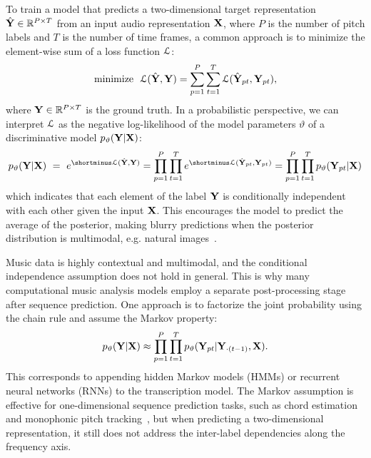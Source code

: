 To train a model that predicts a two-dimensional target representation $\hat{\mathbf{Y}} \in \mathbb{R}^{P \times T}$ from an input audio representation $\mathbf{X}$, where $P$ is the number of pitch labels and $T$ is the number of time frames, a common approach is to minimize the element-wise sum of a loss function $\mathcal{L}$:
\begin{equation}\label{eqn:elementwise}
\textrm{minimize} ~~ \mathcal{L}(\hat{\mathbf{Y}}, \mathbf{Y}) = \sum_{p=1}^{P}  \sum_{t=1}^{T} \mathcal{L} (\hat{\mathbf{Y}}_{pt}, \mathbf{Y}_{pt}),
\end{equation}
where $\mathbf{Y} \in \mathbb{R}^{P \times T}$ is the ground truth.
In a probabilistic perspective, we can interpret $\mathcal{L}$ as the negative log-likelihood of the model parameters $\vartheta$ of a discriminative model $p_\vartheta(\mathbf{Y} | \mathbf{X})$:
\begin{equation}
p_\vartheta(\Y | \X) ~=~ e^{\shortminus\L(\hat{\Y}, \Y)} = \prod_{p=1}^{P} \prod_{t=1}^{T} e^{\shortminus\L(\hat{\Y}_{pt}, \Y_{pt})} = \prod_{p=1}^{P} \prod_{t=1}^{T} p_\vartheta(\Y_{pt} | \X)
\end{equation}
which indicates that each element of the label $\mathbf{Y}$ is conditionally independent with each other given the input $\mathbf{X}$.
This encourages the model to predict the average of the posterior, making blurry predictions when the posterior distribution is multimodal, e.g. natural images~\cite{dosovitskiy2016generating}.

Music data is highly contextual and multimodal, and the conditional independence assumption does not hold in general.
This is why many computational music analysis models employ a separate post-processing stage after sequence prediction.
One approach is to factorize the joint probability using the chain rule and assume the Markov property:
\begin{equation}
p_\vartheta(\mathbf{Y}|\mathbf{X}) \approx \prod_{p=1}^{P} \prod_{t=1}^{T} p_\vartheta(\mathbf{Y}_{pt} | \mathbf{Y}_{\cdot(t-1)}, \mathbf{X}).
\end{equation}
This corresponds to appending hidden Markov models (HMMs) \cite{poliner2006discriminative} or recurrent neural networks (RNNs) \cite{sigtia2016endtoend,hawthorne2018onsetsframes} to the transcription model.
The Markov assumption is effective for one-dimensional sequence prediction tasks, such as chord estimation~\cite{ni2012harmonic} and monophonic pitch tracking~\cite{mauch2014pyin}, but when predicting a two-dimensional representation, it still does not address the inter-label dependencies along the frequency axis.


